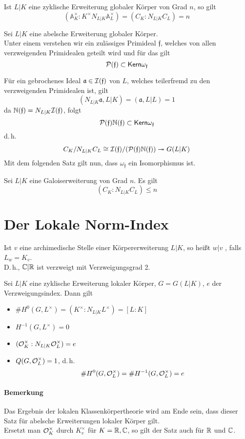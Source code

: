 \documentclass{book}
\renewcommand{\A}{\mathbb{A}}
\renewcommand{\i}{^{-1}}
\newcommand{\af}{\mathfrak{a}}
\newcommand{\ff}{\mathfrak{f}}
\begin{document}
\Satz{}
Ist $L|K$ eine zyklische Erweiterung globaler Körper von Grad $n$, so gilt
\[ (\A_K^\times : K^\times N_{L|K} \A_L^\times ) = (C_K : N_{L|K}C_L) = n \]

Sei $L|K$ eine abelsche Erweiterung globaler Körper.\\
Unter einem  verstehen wir ein zulässiges Primideal $\ff$, welches von allen verzweigenden Primidealen geteilt wird und für das gilt
\[ \P(\ff) \subset \Ker \omega_\ff \]

\Bem{}
Für ein gebrochenes Ideal $\af \in \I(\ff)$ von $L$, welches teilerfremd zu den verzweigenden Primidealen ist, gilt
\[ (N_{L|K}\af, L|K) = (\af, L|L) = 1 \]
da $\N(\ff) = N_{L|K} \I(\ff)$, folgt
\[ \P(\ff) \N(\ff) \subset \Ker \omega_\ff  \]
d.\,h.
\[ C_K/N_{L|K}C_L \isom{} \I(\ff) / (\P(\ff) \N(\ff)) \surj{} G(L|K) \]
Mit dem folgenden Satz gilt nun, dass $\omega_\ff$ ein Isomorphismus ist.

Sei $L|K$ eine Galoiserweiterung von Grad $n$. Es gilt
\[ (C_K : N_{L|K}C_L ) \leq n \]

\section{Der Lokale Norm-Index}

Ist $v$ eine archimedische Stelle einer Körpererweiterung $L|K$, so heißt $w|v$ , falls $L_w = K_v$.\\
D.\,h., $\mathbb{C}|\mathbb{R}$ ist verzweigt mit Verzweigungsgrad 2.

\Satz{}
Sei $L|K$ eine zyklische Erweiterung lokaler Körper, $G = G(L|K)$, $e$ der Verzweigungsindex. Dann gilt
\begin{itemize}
\item $\# H^0(G,L^\times) = (K^\times : N_{L|K}L^\times) = [L:K]$
\item $H\i(G,L^\times) = 0$
\item $(\mathcal{O}_K^\times : N_{L|K}\mathcal{O}_L^\times) = e$
\item $Q(G, \mathcal{O}_L^\times) = 1$, d.\,h. 
\[ \#H^0(G, \O_L^\times) = \#H\i(G, \O_L^\times) = e \]
\end{itemize}
\paragraph{Bemerkung}
Das Ergebnis der lokalen Klassenkörpertheorie wird am Ende sein, dass dieser Satz für abelsche Erweiterungen lokaler Körper gilt.\\
Ersetzt man $\mathcal{O}_K^\times$ durch $K_v^\times$ für $K = \mathbb{R},\mathbb{C}$, so gilt der Satz auch für $\mathbb{R}$ und $\mathbb{C}$.
\end{document}
